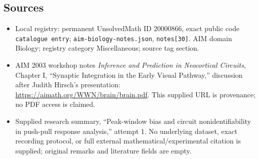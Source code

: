 \documentclass[11pt]{article}
\begin{document}
\subsection{Sources}
\begin{itemize}
\item Local registry: permanent UnsolvedMath ID \(20000866\), exact public code \texttt{catalogue entry}; \texttt{aim-biology-notes.json}, \texttt{notes[30]}. AIM domain Biology; registry category Miscellaneous; source tag section.
\item AIM 2003 workshop notes \emph{Inference and Prediction in Neocortical Circuits}, Chapter I, ``Synaptic Integration in the Early Visual Pathway,'' discussion after Judith Hirsch's presentation: \url{https://aimath.org/WWN/brain/brain.pdf}. This supplied URL is provenance; no PDF access is claimed.
\item Supplied research summary, ``Peak-window bias and circuit nonidentifiability in push-pull response analysis,'' attempt 1. No underlying dataset, exact recording protocol, or full external mathematical/experimental citation is supplied; original remarks and literature fields are empty.
\end{itemize}
\end{document}
